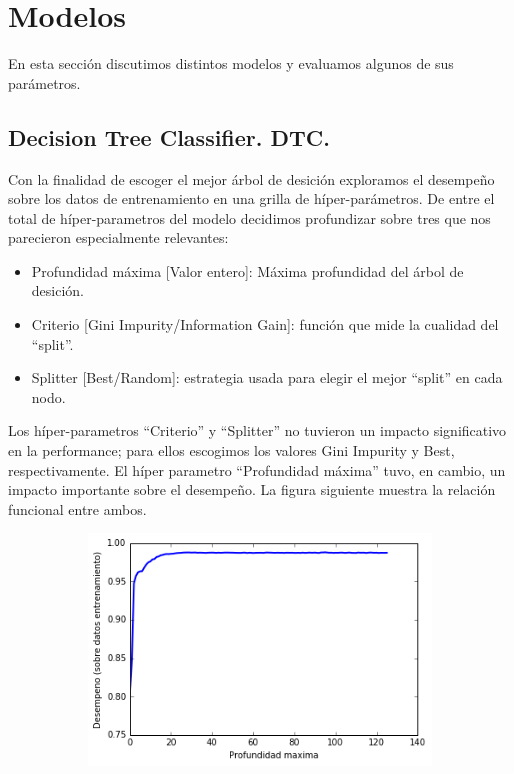 \documentclass[a4paper,10pt]{article}
\begin{document}
\section{Modelos} \label{sec:modelos}

En esta secci\'on discutimos distintos modelos y evaluamos algunos de sus par\'ametros.  

\subsection{Decision Tree Classifier. DTC.}

\par Con la finalidad de escoger el mejor árbol de desición exploramos 
el desempeño sobre los datos de entrenamiento en una grilla de híper-parámetros.
De entre el total de híper-parametros del modelo decidimos profundizar sobre 
tres que nos parecieron especialmente relevantes:
\begin{itemize}
 \item Profundidad máxima [Valor entero]: Máxima profundidad del árbol de desición. 
 \item Criterio [Gini Impurity/Information Gain]: función que mide la cualidad 
del ``split''. 
  \item Splitter [Best/Random]: estrategia usada para elegir el mejor 
``split'' en cada nodo.
\end{itemize}

Los híper-parametros ``Criterio'' y ``Splitter'' no tuvieron un impacto 
significativo en la performance; para ellos escogimos los valores Gini Impurity 
y Best, respectivamente.
El híper parametro ``Profundidad máxima'' tuvo, en cambio, un impacto 
importante sobre el desempeño. La figura siguiente muestra 
la relación funcional entre ambos.

  \begin{figure}[H]
    \centering
    \begin{subfigure}[b]{0.4\textwidth}
      \includegraphics[width=\textwidth]{../imagenes/desempeno-profundiad_arboles}
    \end{subfigure}
    \caption{}
    \label{fig:autovalores}
  \end{figure}
\end{document}
